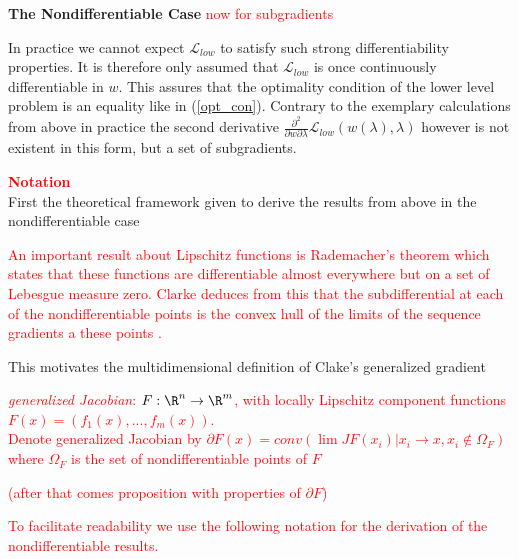 
\textbf{The Nondifferentiable Case}
\textcolor{red}{now for subgradients}

In practice we cannot expect \(\mathcal{L}_{low}\) to satisfy such strong differentiability properties.
It is therefore only assumed that \(\mathcal{L}_{low}\) is once continuously differentiable in \(w\). This assures that the optimality condition of the lower level problem is an equality like in (\ref{opt_con}).
Contrary to the exemplary calculations from above in practice the second derivative \(\frac{\partial^2}{\partial w \partial \lambda} \mathcal{L}_{low}(w(\lambda),\lambda)\) however is not existent in this form, but a set of subgradients.



\textcolor{red}{\textbf{Notation}}\\
First the theoretical framework given to derive the results from above in the nondifferentiable case



\textcolor{red}{An important result about Lipschitz functions is Rademacher's theorem which states that these functions are differentiable almost everywhere but on a set of Lebesgue measure zero\cite[Theorem 3.1]{Heinonen2004}. 
Clarke deduces from this that the subdifferential at each of the nondifferentiable points is the convex hull of the limits of the sequence gradients a these points \cite[see Theorem 2.5.1]{Clarke1990}.}

This motivates the multidimensional definition of Clake's generalized gradient 

\textcolor{red}{
\begin{definition}
	\emph{generalized Jacobian}: \(F:\R^n \to \R^m\), with locally Lipschitz component functions \(F(x) = (f_1(x),...,f_m(x))\).\\
	Denote generalized Jacobian by \(\partial F(x) = conv\left(\lim JF(x_i)|x_i\to x, x_i \notin \Omega_F \right) \) where \(\Omega_F\) is the set of nondifferentiable points of \(F\)
\end{definition}
(after that comes proposition with properties of \(\partial F\))}


\textcolor{red}{To facilitate readability we use the following notation for the derivation of the nondifferentiable results.}

